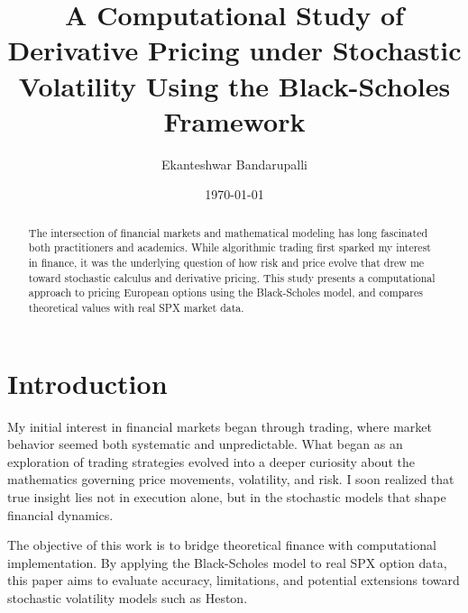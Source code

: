 \documentclass[12pt]{article}
\title{A Computational Study of Derivative Pricing under Stochastic Volatility Using the Black-Scholes Framework}
\author{Ekanteshwar Bandarupalli}
\date{\today}
\begin{document}
\maketitle

\begin{abstract}
The intersection of financial markets and mathematical modeling has long fascinated both practitioners and academics. 
While algorithmic trading first sparked my interest in finance, it was the underlying question of how risk and price evolve 
that drew me toward stochastic calculus and derivative pricing. This study presents a computational approach to pricing European options 
using the Black-Scholes model, and compares theoretical values with real SPX market data.
\end{abstract}

\section{Introduction}
My initial interest in financial markets began through trading, where market behavior seemed both systematic and unpredictable. 
What began as an exploration of trading strategies evolved into a deeper curiosity about the mathematics governing price movements, 
volatility, and risk. I soon realized that true insight lies not in execution alone, but in the stochastic models that shape financial dynamics.

The objective of this work is to bridge theoretical finance with computational implementation. By applying the Black-Scholes model 
to real SPX option data, this paper aims to evaluate accuracy, limitations, and potential extensions toward stochastic volatility models such as Heston.
\end{document}
